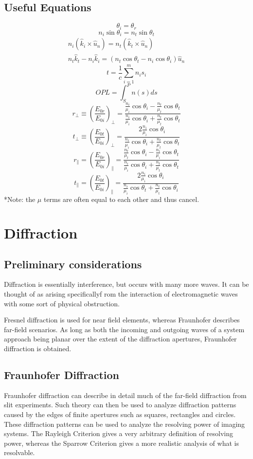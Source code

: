 \documentclass[12pt]{report}
\begin{document}
\section{Useful Equations}
\[\theta_i = \theta_r\]
\[n_i\sin\theta_i = n_t\sin\theta_t\]
\[\begin{array}{c}
n_i(\hat{k}_i \times \hat{u}_n) = n_t (\hat{k}_t \times \hat{u}_n) \\
n_t\hat{k}_t -n_i\hat{k}_i = (n_t\cos\theta_t - n_i\cos\theta_i) \hat{u}_n
\end{array}\]
\[t = \frac{1}{c}\sum_{i=1}^m n_is_i\]
\[OPL = \int_S^P n(s) ds\]
\[r_\perp \equiv \left(\frac{E_{0r}}{E_{0i}}\right)_\perp = \frac{\frac{n_i}{\mu_i}\cos \theta_i-\frac{n_t}{\mu_t}\cos \theta_t}{\frac{n_i}{\mu_i}\cos \theta_i+\frac{n_t}{\mu_t}\cos \theta_t}\]
\[t_\perp \equiv \left(\frac{E_{0t}}{E_{0i}}\right)_\perp = \frac{2 \frac{n_i}{\mu_i}\cos \theta_i}{\frac{n_i}{\mu_i}\cos \theta_i+\frac{n_t}{\mu_t}\cos \theta_t}\]
\[r_\parallel = \left(\frac{E_{0r}}{E_{0i}}\right)_\parallel = \frac{\frac{n_t}{\mu_t}\cos \theta_i-\frac{n_i}{\mu_i}\cos \theta_t}{\frac{n_i}{\mu_i}\cos \theta_i+\frac{n_t}{\mu_t}\cos \theta_t}\]
\[t_\parallel = \left(\frac{E_{0t}}{E_{0i}}\right)_\parallel = \frac{2 \frac{n_i}{\mu_i}\cos \theta_i}{\frac{n_i}{\mu_i}\cos \theta_t+\frac{n_t}{\mu_t}\cos \theta_i}\]
*Note: the $\mu$ terms are often equal to each other and thus cancel. 

\chapter{Diffraction}
\section{Preliminary considerations}
Diffraction is essentially interference, but occurs with many more waves. It can be thought of as arising specificallyf rom the interaction of electromagnetic waves with some sort of physical obstruction. 

Fresnel diffraction is used for near field elements, whereas Fraunhofer describes far-field scenarios. As long as both the incoming and outgoing waves of a system approach being planar over the extent of the diffraction apertures, Fraunhofer diffraction is obtained. 

\section{Fraunhofer Diffraction}
Fraunhofer diffraction can describe in detail much of the far-field diffraction from slit experiments. Such theory can then be used to analyze diffraction patterns caused by the edges of finite apertures such as squares, rectangles and circles. These diffraction patterns can be used to analyze the resolving power of imaging systems. The Rayleigh Criterion gives a very arbitrary definition of resolving power, whereas the Sparrow Criterion gives a more realistic analysis of what is resolvable. 
\end{document}
